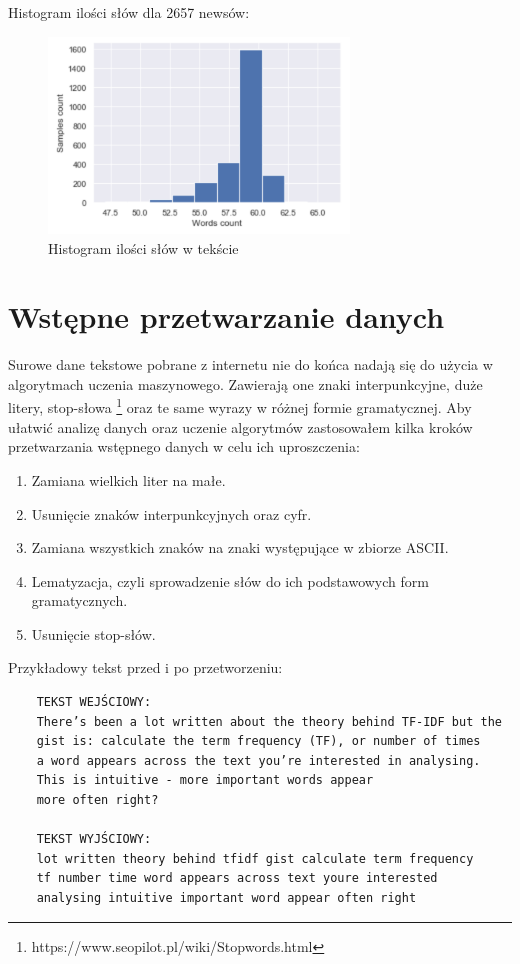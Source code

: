 Histogram ilości słów dla 2657 newsów:

    \begin{figure}[H]
    \includegraphics[width=8cm]{words_count.png}
    \centering
    \caption{Histogram ilości słów w tekście}
    \end{figure} 

\section{Wstępne przetwarzanie danych}

Surowe dane tekstowe pobrane z internetu nie do końca nadają się do użycia w algorytmach uczenia maszynowego. Zawierają one znaki interpunkcyjne, duże litery, stop-słowa \footnote{https://www.seopilot.pl/wiki/Stopwords.html} oraz te same wyrazy w różnej formie gramatycznej. Aby ułatwić analizę danych oraz uczenie algorytmów zastosowałem kilka kroków przetwarzania wstępnego danych w celu ich uproszczenia:

\begin{enumerate}
    \item Zamiana wielkich liter na małe.
    \item Usunięcie znaków interpunkcyjnych oraz cyfr.
    \item Zamiana wszystkich znaków na znaki występujące w zbiorze ASCII.
    \item Lematyzacja, czyli sprowadzenie słów do ich podstawowych form gramatycznych.
    \item Usunięcie stop-słów.
\end{enumerate}

\newpage
Przykładowy tekst przed i po przetworzeniu:

\begin{verbatim}
    TEKST WEJŚCIOWY: 
    There’s been a lot written about the theory behind TF-IDF but the 
    gist is: calculate the term frequency (TF), or number of times 
    a word appears across the text you’re interested in analysing.
    This is intuitive - more important words appear 
    more often right?
    
    TEKST WYJŚCIOWY: 
    lot written theory behind tfidf gist calculate term frequency
    tf number time word appears across text youre interested
    analysing intuitive important word appear often right
\end{verbatim}

